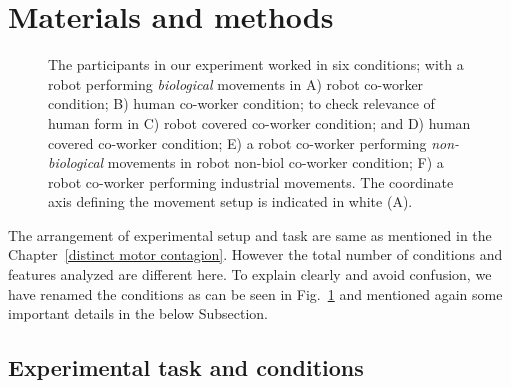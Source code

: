 
\section{Materials and methods} \label{methods}

\begin{figure}[b]
	\caption{The participants in our experiment worked in six conditions; with a robot performing \textit{biological} movements in A) robot co-worker condition; B) human co-worker condition; to check relevance of  human form in C) robot covered co-worker condition; and D) human covered co-worker condition; E) a robot co-worker performing \textit{non-biological} movements in robot non-biol co-worker condition; F) a robot co-worker performing industrial movements. The coordinate axis defining the movement setup is indicated in white (A).}
	\label{fig:setup1}
\end{figure}

The arrangement of experimental setup and task are same as mentioned in the Chapter~\ref{distinct motor contagion}. However the total number of conditions and features analyzed are different here. To explain clearly and avoid confusion, we have renamed the conditions as can be seen in Fig.~\ref{fig:setup1} and mentioned again some important details in the below Subsection.

\subsection{Experimental task and conditions}

